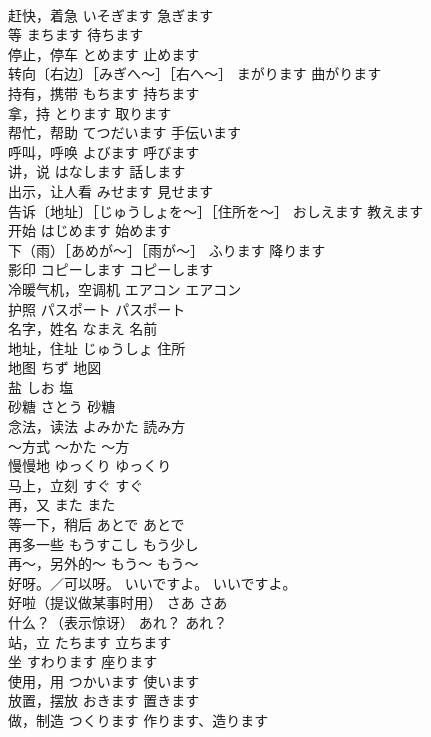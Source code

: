 \documentclass[8pt]{extreport}
\begin{document}
\begin{CJK}{UTF8}{min}
\\	赶快，着急	いそぎます	急ぎます
\\	等	まちます	待ちます
\\	停止，停车	とめます	止めます
\\	转向〔右边〕［みぎへ～］［右へ～］	まがります	曲がります
\\	持有，携带	もちます	持ちます
\\	拿，持	とります	取ります
\\	帮忙，帮助	てつだいます	手伝います
\\	呼叫，呼唤	よびます	呼びます
\\	讲，说	はなします	話します
\\	出示，让人看	みせます	見せます
\\	告诉〔地址〕［じゅうしょを～］［住所を～］	おしえます	教えます
\\	开始	はじめます	始めます
\\	下（雨）［あめが～］［雨が～］	ふります	降ります
\\	影印	コピーします	コピーします
\\	冷暖气机，空调机	エアコン	エアコン
\\	护照	パスポート	パスポート
\\	名字，姓名	なまえ	名前
\\	地址，住址	じゅうしょ	住所
\\	地图	ちず	地図
\\	盐	しお	塩
\\	砂糖	さとう	砂糖
\\	念法，读法	よみかた	読み方
\\	～方式	～かた	～方
\\	慢慢地	ゆっくり	ゆっくり
\\	马上，立刻	すぐ	すぐ
\\	再，又	また	また
\\	等一下，稍后	あとで	あとで
\\	再多一些	もうすこし	もう少し
\\	再～，另外的～	もう～	もう～
\\	好呀。／可以呀。	いいですよ。	いいですよ。
\\	好啦（提议做某事时用）	さあ	さあ
\\	什么？（表示惊讶）	あれ？	あれ？
\\	站，立	たちます	立ちます
\\	坐	すわります	座ります
\\	使用，用	つかいます	使います
\\	放置，摆放	おきます	置きます
\\	做，制造	つくります	作ります、造ります

\end{CJK}
\end{document}
